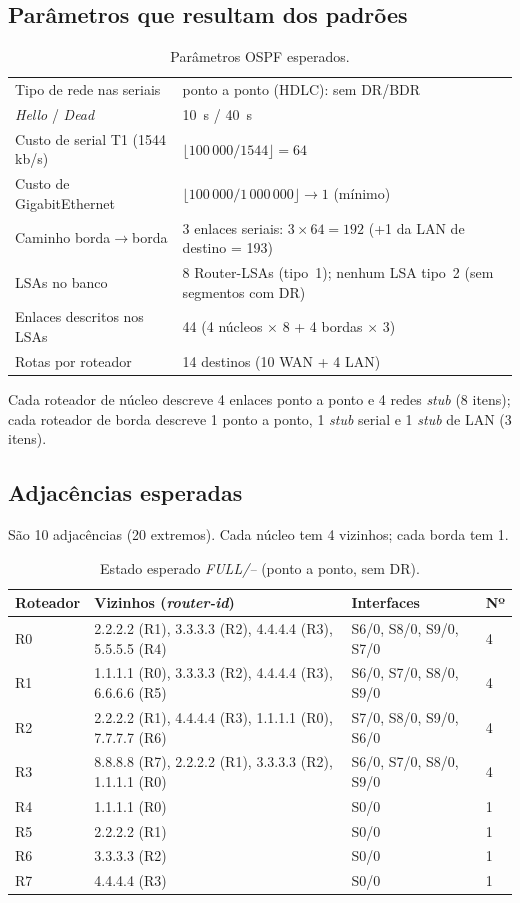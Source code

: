 \documentclass[12pt,a4paper]{article}
\begin{document}
\subsection{Parâmetros que resultam dos padrões}
\begin{table}[H]\centering\small
\begin{tabular}{@{}ll@{}}\toprule
Tipo de rede nas seriais & ponto a ponto (HDLC): sem DR/BDR\\
\textit{Hello} / \textit{Dead} & 10~s / 40~s\\
Custo de serial T1 (1544 kb/s) & $\lfloor 100\,000 / 1544\rfloor = 64$\\
Custo de GigabitEthernet & $\lfloor 100\,000 / 1\,000\,000\rfloor \to 1$ (mínimo)\\
Caminho borda$\to$borda & 3 enlaces seriais: $3\times 64 = 192$ (+1 da LAN de destino = 193)\\
LSAs no banco & 8 Router-LSAs (tipo~1); nenhum LSA tipo~2 (sem segmentos com DR)\\
Enlaces descritos nos LSAs & 44 (4 núcleos $\times$ 8 + 4 bordas $\times$ 3)\\
Rotas por roteador & 14 destinos (10 WAN + 4 LAN)\\ \bottomrule
\end{tabular}
\caption{Parâmetros OSPF esperados.}
\end{table}
Cada roteador de núcleo descreve 4 enlaces ponto a ponto e 4 redes \textit{stub} (8 itens); cada roteador de borda descreve 1 ponto a ponto, 1 \textit{stub} serial e 1 \textit{stub} de LAN (3 itens).

\subsection{Adjacências esperadas}
São 10 adjacências (20 extremos). Cada núcleo tem 4 vizinhos; cada borda tem 1.
\begin{table}[H]\centering\small
\begin{tabular}{@{}llll@{}}\toprule
Roteador & Vizinhos (\textit{router-id}) & Interfaces & Nº\\\midrule
R0 & 2.2.2.2 (R1), 3.3.3.3 (R2), 4.4.4.4 (R3), 5.5.5.5 (R4) & S6/0, S8/0, S9/0, S7/0 & 4\\
R1 & 1.1.1.1 (R0), 3.3.3.3 (R2), 4.4.4.4 (R3), 6.6.6.6 (R5) & S6/0, S7/0, S8/0, S9/0 & 4\\
R2 & 2.2.2.2 (R1), 4.4.4.4 (R3), 1.1.1.1 (R0), 7.7.7.7 (R6) & S7/0, S8/0, S9/0, S6/0 & 4\\
R3 & 8.8.8.8 (R7), 2.2.2.2 (R1), 3.3.3.3 (R2), 1.1.1.1 (R0) & S6/0, S7/0, S8/0, S9/0 & 4\\
R4 & 1.1.1.1 (R0) & S0/0 & 1\\
R5 & 2.2.2.2 (R1) & S0/0 & 1\\
R6 & 3.3.3.3 (R2) & S0/0 & 1\\
R7 & 4.4.4.4 (R3) & S0/0 & 1\\\bottomrule
\end{tabular}
\caption{Estado esperado \textit{FULL/--} (ponto a ponto, sem DR).}
\end{table}
\end{document}

